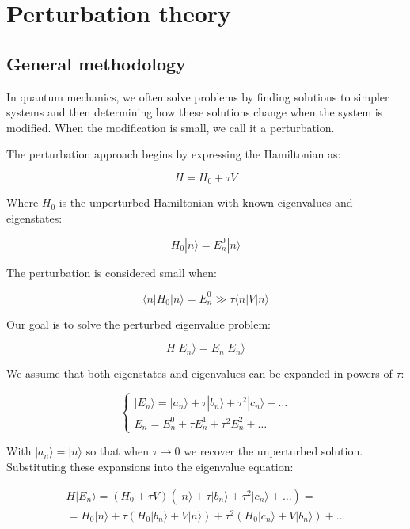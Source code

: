 \chapter{Perturbation theory}
\section{General methodology}
In quantum mechanics, we often solve problems by finding solutions to simpler systems and then determining how these solutions change when the system is modified. When the modification is small, we call it a perturbation.


The perturbation approach begins by expressing the Hamiltonian as:

\begin{equation}
H=H_0+\tau V
\end{equation}

Where $H_0$ is the unperturbed Hamiltonian with known eigenvalues and eigenstates:

\begin{equation}
H_0|n\rangle=E_n^0|n\rangle
\end{equation}

The perturbation is considered small when:

\begin{equation}
\langle n|H_0|n\rangle=E_n^0 \gg \tau\langle n|V|n\rangle
\end{equation}

Our goal is to solve the perturbed eigenvalue problem:

\begin{equation}
H|E_n\rangle=E_n|E_n\rangle
\end{equation}

We assume that both eigenstates and eigenvalues can be expanded in powers of $\tau$:

\[
\left\{\begin{array}{l}
|E_n\rangle=|a_n\rangle+\tau|b_n\rangle+\tau^2|c_n\rangle+\ldots \\
E_n=E_n^0+\tau E_n^1+\tau^2 E_n^2+\ldots
\end{array}\right.
\]

With $|a_n\rangle=|n\rangle$ so that when $\tau\rightarrow 0$ we recover the unperturbed solution. Substituting these expansions into the eigenvalue equation:

\[
\begin{array}{r}
H|E_n\rangle=(H_0+\tau V)(|n\rangle+\tau|b_n\rangle+\tau^2|c_n\rangle+\ldots)=\\
=H_0|n\rangle+\tau(H_0|b_n\rangle+V|n\rangle)+\tau^2(H_0|c_n\rangle+V|b_n\rangle)+\ldots
\end{array}
\]

